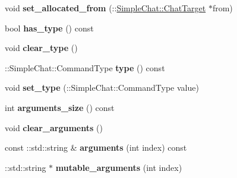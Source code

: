 \begin{DoxyCompactItemize}
\item 
\hypertarget{classSimpleChat_1_1ChatCommand_ac1d0a0670c25e0bd45fb4fb1b3681778}{void {\bfseries set\-\_\-allocated\-\_\-from} (\-::\hyperlink{classSimpleChat_1_1ChatTarget}{Simple\-Chat\-::\-Chat\-Target} $\ast$from)}\label{classSimpleChat_1_1ChatCommand_ac1d0a0670c25e0bd45fb4fb1b3681778}

\item 
\hypertarget{classSimpleChat_1_1ChatCommand_ac025a3bd4ab17df6a987556a62d21d32}{bool {\bfseries has\-\_\-type} () const }\label{classSimpleChat_1_1ChatCommand_ac025a3bd4ab17df6a987556a62d21d32}

\item 
\hypertarget{classSimpleChat_1_1ChatCommand_ae22b2fee3b56c197da6ccaebb65cc461}{void {\bfseries clear\-\_\-type} ()}\label{classSimpleChat_1_1ChatCommand_ae22b2fee3b56c197da6ccaebb65cc461}

\item 
\hypertarget{classSimpleChat_1_1ChatCommand_a4453b6409f99900ff72ade406388ab36}{\-::Simple\-Chat\-::\-Command\-Type {\bfseries type} () const }\label{classSimpleChat_1_1ChatCommand_a4453b6409f99900ff72ade406388ab36}

\item 
\hypertarget{classSimpleChat_1_1ChatCommand_aa6edfc9ce7ca03bdb4d6708012287d3e}{void {\bfseries set\-\_\-type} (\-::Simple\-Chat\-::\-Command\-Type value)}\label{classSimpleChat_1_1ChatCommand_aa6edfc9ce7ca03bdb4d6708012287d3e}

\item 
\hypertarget{classSimpleChat_1_1ChatCommand_a95b2f8f664a9190c1688437015ede8ea}{int {\bfseries arguments\-\_\-size} () const }\label{classSimpleChat_1_1ChatCommand_a95b2f8f664a9190c1688437015ede8ea}

\item 
\hypertarget{classSimpleChat_1_1ChatCommand_a68ced4138bb856398cd6c9e47be087aa}{void {\bfseries clear\-\_\-arguments} ()}\label{classSimpleChat_1_1ChatCommand_a68ced4138bb856398cd6c9e47be087aa}

\item 
\hypertarget{classSimpleChat_1_1ChatCommand_a50259127f8c8d28f7aca853ffe564f93}{const \-::std\-::string \& {\bfseries arguments} (int index) const }\label{classSimpleChat_1_1ChatCommand_a50259127f8c8d28f7aca853ffe564f93}

\item 
\hypertarget{classSimpleChat_1_1ChatCommand_a236b147dbfff3ab0f83956a85f8755be}{\-::std\-::string $\ast$ {\bfseries mutable\-\_\-arguments} (int index)}\label{classSimpleChat_1_1ChatCommand_a236b147dbfff3ab0f83956a85f8755be}


\end{DoxyCompactItemize}
